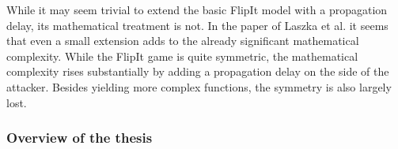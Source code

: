 While it may seem trivial to extend the basic FlipIt model with a propagation delay, its mathematical treatment is not. In the paper of Laszka et al. \citep{FlipThem} it seems that even a small extension adds to the already significant mathematical complexity. While the FlipIt game is quite symmetric, the mathematical complexity rises substantially by adding a propagation delay on the side of the attacker. Besides yielding more complex functions, the symmetry is also largely lost.

%

\subsubsection{Overview of the thesis}

